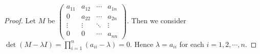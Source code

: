 \begin{Exercise}
\begin{proof}
Let $M$ be $\begin{pmatrix}
a_{1 1} & a_{1 2} & \cdots & a_{1 n} \\
0 & a_{2 2} & \cdots & a_{2 n} \\
\vdots & \vdots & \ddots & \vdots \\
0 & 0 & \cdots & a_{n n}
\end{pmatrix}$. Then we consider $\det(M-\lambda I) = \prod_{i=1}^{n} (a_{i i} - \lambda) = 0$. Hence $\lambda = a_{i i}$ for each $i=1,2,\cdots,n$.
\end{proof}
\end{Exercise}